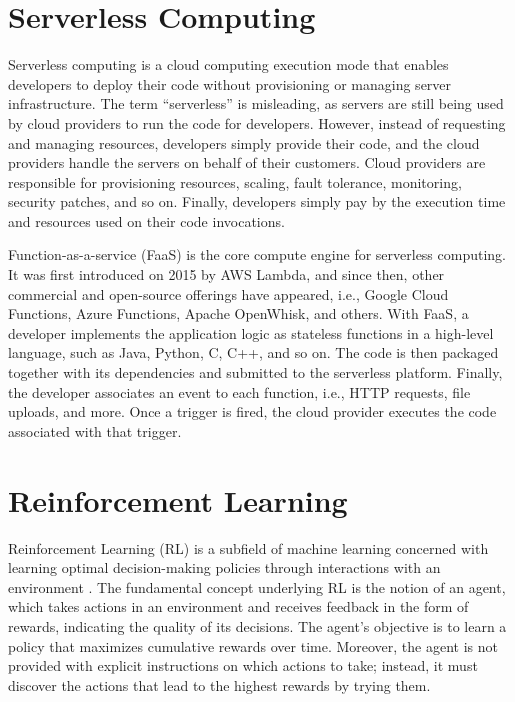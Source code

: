 \section{Serverless Computing}

Serverless computing is a cloud computing execution mode that enables developers to deploy their code without provisioning or managing server infrastructure. The term “serverless” is misleading, as servers are still being used by cloud providers to run the code for developers. However, instead of requesting and managing resources, developers simply provide their code, and the cloud providers handle the servers on behalf of their customers. Cloud providers are responsible for provisioning resources, scaling, fault tolerance, monitoring, security patches, and so on. Finally, developers simply pay by the execution time and resources used on their code invocations.

Function-as-a-service (FaaS) is the core compute engine for serverless computing. It was first introduced on 2015 by AWS Lambda, and since then, other commercial and open-source offerings have appeared, i.e., Google Cloud Functions, Azure Functions, Apache OpenWhisk, and others. With FaaS, a developer implements the application logic as stateless functions in a high-level language, such as Java, Python, C, C++, and so on. The code is then packaged together with its dependencies and submitted to the serverless platform. Finally, the developer associates an event to each function, i.e., HTTP requests, file uploads, and more. Once a trigger is fired, the cloud provider executes the code associated with that trigger.

\section{Reinforcement Learning}

Reinforcement Learning (RL) is a subfield of machine learning concerned with learning optimal decision-making policies through interactions with an environment \cite{sutton2018reinforcement}. The fundamental concept underlying RL is the notion of an agent, which takes actions in an environment and receives feedback in the form of rewards, indicating the quality of its decisions. The agent's objective is to learn a policy that maximizes cumulative rewards over time. Moreover, the agent is not provided with explicit instructions on which actions to take; instead, it must discover the actions that lead to the highest rewards by trying them.

